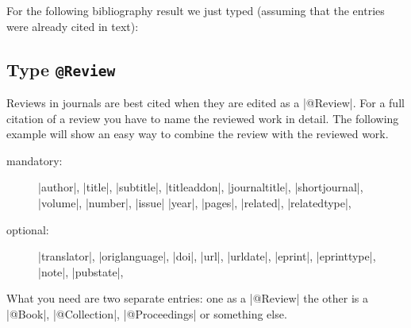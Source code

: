 \documentclass[a4paper,
10pt,
greek,
french,
spanish,
italian,
ngerman,
english
]{ltxdoc}
\begin{document}
For the following bibliography result we just typed (assuming that the entries were already cited in text):

\begin{refsection}
\nocite{Lexikon-der-Technik,Weinbrenner1914,LTUR,Neils1994}
\setlength{\labwidthsameline}{5em} 
\begin{example}
\printbibliography[keyword=corpus,title={Corpora}]
\printbibliography[notkeyword=corpus]
\end{example}
\end{refsection}


 
\subsection{Type \texttt{@Review}}\label{review}
Reviews in journals are best cited when they are edited as a |@Review|.
For a full citation of a review you have to name the reviewed work in detail.
The following example will show an easy way to combine the review with the reviewed work.

\begin{description}
\item[mandatory:] 
|author|, |title|, |subtitle|, |titleaddon|,
|journaltitle|, |shortjournal|, |volume|, |number|, |issue|
|year|, |pages|, 
|related|, |relatedtype|,
\item[optional:]
|translator|, |origlanguage|,
|doi|, |url|, |urldate|, |eprint|, |eprinttype|, |note|, |pubstate|, 
 \end{description}

What you need are two separate entries: one as a |@Review| the other is a |@Book|, |@Collection|, |@Proceedings| or something else.
\end{document}
